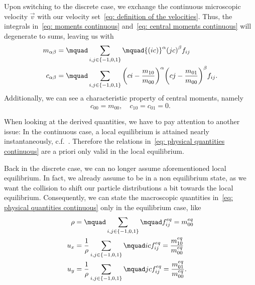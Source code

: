 Upon switching to the discrete case, we exchange the continuous microscopic velocity $\vec{v}$ with our velocity set~\eqref{eq: definition of the velocities}.
Thus, the integrals in~\eqref{eq: moments continuous} and~\eqref{eq: central moments continuous} will degenerate to sums, leaving us with
\begin{align}
  m_{\alpha\beta} &= \mquad\sum_{i,j \in \{-1,0,1\}}\mquad {(ic)}^\alpha {(jc)}^\beta f_{ij}
  \label{eq: moment definition}\\
  c_{\alpha\beta} &= \mquad\sum_{i,j \in \{-1,0,1\}}
  {\left(ci - \frac{m_{10}}{m_{00}}\right)}^\alpha
  {\left(cj - \frac{m_{01}}{m_{00}}\right)}^\beta f_{ij}.
  \label{eq: central moment definition}
\end{align}
Additionally, we can see a characteristic property of central moments, namely
\begin{equation}
  \label{eq: low central moments}
  c_{00}=m_{00},\quad c_{10} = c_{01}=0.
\end{equation}

When looking at the derived quantities, we have to pay attention to another issue:
In the continuous case, a local equilibrium is attained nearly instantaneously, c.f.~\cite[page 218]{smits2000physical}.
Therefore the relations in~\eqref{eq: physical quantities continuous} are a priori only valid in the local equilibrium.

Back in the discrete case, we can no longer assume aforementioned local equilibrium.
In fact, we already assume to be in a non equilibrium state, as we want the collision to shift our particle distributions a bit towards the local equilibrium.
Consequently, we can state the macroscopic quantities in~\eqref{eq: physical quantities continuous} only in the equilibrium case, like
\begin{align}
  \rho & = \mquad\sum_{i,j \in \{-1,0,1\}}\mquad f_{ij}^{eq} = m_{00}^{eq}
  \label{eq: density definition raw}\\
  u_x  & = \frac{1}{\rho} \sum_{i,j \in \{-1,0,1\}}\mquad ic f_{ij}^{eq} = \frac{m_{10}^{eq}}{m_{00}^{eq}}
  \label{eq: x velocity definition raw}\\
  u_y  & = \frac{1}{\rho} \sum_{i,j \in \{-1,0,1\}}\mquad jc f_{ij}^{eq} = \frac{m_{01}^{eq}}{m_{00}^{eq}}.
  \label{eq: y velocity definition raw}
\end{align}


